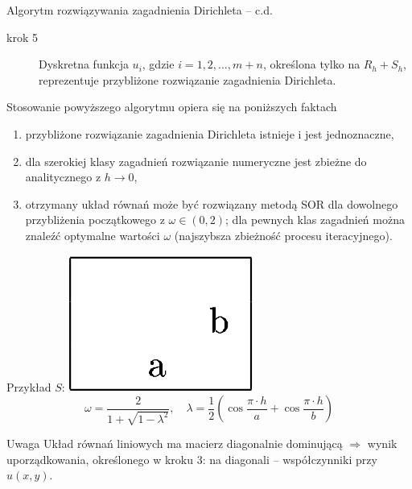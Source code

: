 \begin{frame}
  \begin{block}{Algorytm rozwiązywania zagadnienia Dirichleta -- c.d.}
    \begin{description}
      \item[krok 5]
        Dyskretna funkcja $u_i$, gdzie $i=1,2, \dots ,m+n$, określona tylko na $R_h + S_h$, reprezentuje przybliżone rozwiązanie zagadnienia Dirichleta.
    \end{description}
  \end{block}

  \begin{block}{Stosowanie powyższego algorytmu opiera się na poniższych faktach}
    \begin{enumerate}
      \item przybliżone rozwiązanie zagadnienia Dirichleta istnieje i jest jednoznaczne,
      \item dla szerokiej klasy zagadnień rozwiązanie numeryczne jest zbieżne do analitycznego z $h \rightarrow 0$,
      \item otrzymany układ równań może być rozwiązany metodą SOR dla dowolnego przybliżenia początkowego z $ \omega \in (0,2)$; dla pewnych klas zagadnień można znaleźć optymalne wartości $\omega$ (najszybsza zbieżność procesu iteracyjnego).
    \end{enumerate}
  \end{block}
\end{frame}

\begin{frame}
  \begin{exampleblock}{Przykład}
    $S$: \includegraphics[width = 0.2 \textwidth]{img/23/prostokat}
    $$ \omega = \frac{2}{1 + \sqrt{1 - \lambda ^2}}, \quad \lambda = \frac{1}{2} \left( \cos \frac{\pi \cdot h}{a} + \cos \frac{\pi \cdot h}{b} \right)$$
  \end{exampleblock}

  \begin{alertblock}{Uwaga}
    Układ równań liniowych ma macierz diagonalnie dominującą $\Rightarrow$ wynik uporządkowania, określonego w kroku 3: na diagonali -- współczynniki przy $u(x,y)$.
  \end{alertblock}
\end{frame}

